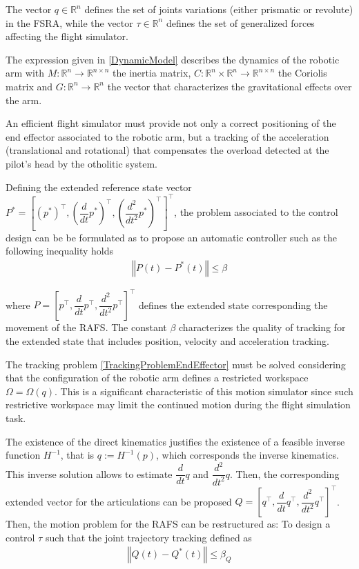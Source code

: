 \documentclass[journal,twocolumn]{IEEEtran}
\begin{document}
The vector $q \in \mathbb{R}^{n} $ defines the set of joints variations (either prismatic or revolute) in the FSRA, while the vector $\tau \in \mathbb{R}^{n}$ defines the set of generalized forces affecting the flight simulator.   

The expression given in \eqref{DynamicModel} describes the dynamics of 
the robotic arm with $M: \mathbb{R}^{n} \rightarrow \mathbb{R}^{n \times n}$ the inertia matrix, $C: \mathbb{R}^{n} \times \mathbb{R}^{n} \rightarrow \mathbb{R}^{n \times n}$ the Coriolis matrix and $G : \mathbb{R}^{n} \rightarrow \mathbb{R}^{n}$ the vector that characterizes the gravitational effects over the arm. 

An efficient flight simulator must provide not only a correct positioning of the end effector associated to the robotic arm, but a tracking of the acceleration (translational and rotational) that compensates the overload detected at the pilot's head by the otholitic system. 


Defining the extended reference state vector $P^{*}= \left[ \left(p^{*}\right)^{\top},\left(\dfrac{d }{d t} p^{*} \right)^{\top}, \left( \dfrac{d^{2} }{d t^{2}} p^{*} \right)^{\top} \right]^{\top}$, the problem associated to the control design can be be formulated as to propose an automatic controller such as the following inequality holds
%
\begin{equation}
    \begin{array}{c}
         \left\Vert P(t) - P^{*}(t) \right\Vert \leq \beta  
    \end{array}
    \label{TrackingProblemEndEffector}
\end{equation}

\noindent where $ P= \left[ p^{\top},\dfrac{d }{d t} p^{\top}, \dfrac{d^{2} }{d t^{2}} p^{\top} \right]^{\top}$ defines the extended state corresponding the movement of the RAFS. The constant $\beta$ characterizes the quality of tracking for the extended state that includes position, velocity and acceleration tracking. 

The tracking problem \eqref{TrackingProblemEndEffector} must be solved considering that the configuration of the robotic arm defines a restricted workspace $\Omega=\Omega(q)$. This is a significant characteristic of this motion simulator since such restrictive workspace may limit the continued motion during the flight simulation task. 

The existence of the direct kinematics justifies the existence of a feasible inverse function $H^{-1}$, that is $q := H^{-1}(p)$, which corresponds the inverse kinematics. This inverse solution allows to estimate $ \dfrac{d}{dt} q $ and $ \dfrac{d^{2}}{dt^{2}} q$. Then, the corresponding extended vector  for the articulations can be proposed $Q = \left[ q^{\top},\dfrac{d }{d t} q^{\top}, \dfrac{d^{2} }{d t^{2}} q^{\top} \right]^{\top}$. Then, the motion problem for the RAFS can be restructured as: To design a control $\tau$ such that the joint trajectory tracking defined as
%
\begin{equation}
    \begin{array}{c}
         \left\Vert Q(t) - Q^{*}(t) \right\Vert \leq \beta_{Q}  
    \end{array}
\end{equation}
\end{document}
